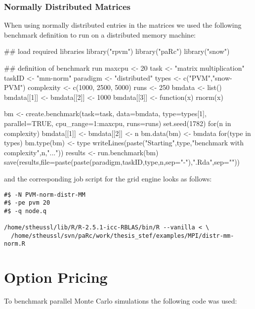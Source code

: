 \subsubsection{Normally Distributed Matrices}

When using normally distributed entries in the matrices we used the
following benchmark definition to run on a distributed memory machine:

\begin{Scode}
## load required libraries
library("rpvm")
library("paRc")
library("snow")

## definition of benchmark run
maxcpu <- 20
task <- "matrix multiplication"
taskID <- "mm-norm"
paradigm <- "distributed"
types <- c("PVM","snow-PVM")
complexity <- c(1000, 2500, 5000)
runs <- 250
bmdata <- list()
bmdata[[1]] <- bmdata[[2]] <- 1000
bmdata[[3]] <- function(x){
  rnorm(x)
}

bm <- create.benchmark(task=task, data=bmdata,
                       type=types[1], parallel=TRUE, cpu_range=1:maxcpu, runs=runs)
set.seed(1782)
for(n in complexity){
  bmdata[[1]] <- bmdata[[2]] <- n
  bm.data(bm) <- bmdata
  for(type in types){
    bm.type(bm) <- type
    writeLines(paste("Starting",type,"benchmark with complexity",n,"..."))
    results <- run.benchmark(bm)
    save(results,file=paste(paste(paradigm,taskID,type,n,sep="-"),".Rda",sep=""))
  }
}
\end{Scode}

and the corresponding job script for the grid engine looks as follows:

\begin{verbatim}
#$ -N PVM-norm-distr-MM
#$ -pe pvm 20
#$ -q node.q

/home/stheussl/lib/R/R-2.5.1-icc-RBLAS/bin/R --vanilla < \
  /home/stheussl/svn/paRc/work/thesis_stef/examples/MPI/distr-mm-norm.R
\end{verbatim}

\section{Option Pricing}

To benchmark parallel Monte Carlo simulations the following code was
used:

